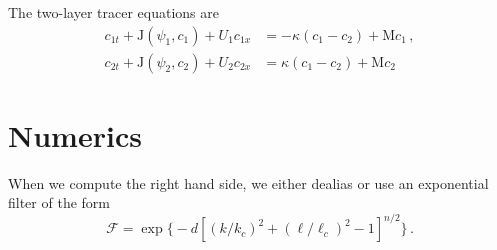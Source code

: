\documentclass[12pt, oneside]{article}
\newcommand{\com}{\, ,}
\newcommand{\per}{\, .}
\newcommand{\beq}{\begin{equation}}
\newcommand{\eeq}{\end{equation}}
\newcommand{\J}{\mathrm{J}}
\newcommand{\mixing}{\mathrm{M}}
\begin{document}
The two-layer tracer equations are
\begin{align}
c_{1t} + \J \left ( \psi_1, c_1 \right ) + U_1 c_{1x} &= - \kappa \left ( c_1 - c_2 \right ) + \mixing c_1 \com \\
c_{2t} + \J \left ( \psi_2, c_2 \right ) + U_2 c_{2x} &=  \kappa \left ( c_1 - c_2 \right ) + \mixing c_2 
\end{align}

\section{Numerics}

When we compute the right hand side, we either dealias or use an exponential filter of the form
\beq
\mathscr{F} = \exp \Big \{ - d \left [ \left ( k / k_c \right )^2 + \left ( \ell / \ell_c \right )^2 - 1 \right ]^{n/2} \Big \} \per
\eeq



\end{document}
